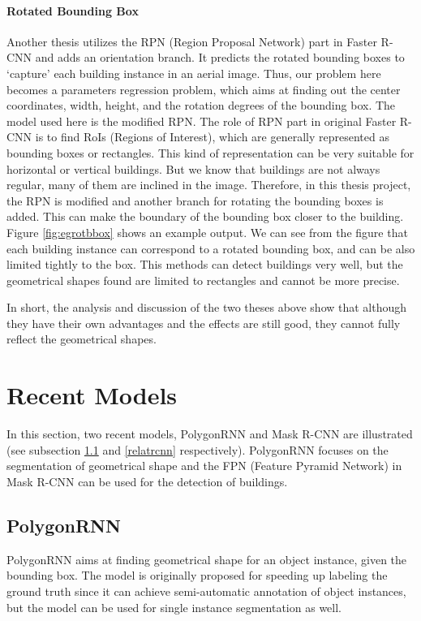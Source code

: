 \paragraph{Rotated Bounding Box}
Another thesis utilizes the RPN (Region Proposal Network) part in Faster R-CNN and adds an orientation branch. It predicts the rotated bounding boxes to `capture' each building instance in an aerial image. Thus, our problem here becomes a parameters regression problem, which aims at finding out the center coordinates, width, height, and the rotation degrees of the bounding box. The model used here is the modified RPN. The role of RPN part in original Faster R-CNN is to find RoIs (Regions of Interest), which are generally represented as bounding boxes or rectangles. This kind of representation can be very suitable for horizontal or vertical buildings. But we know that buildings are not always regular, many of them are inclined in the image. Therefore, in this thesis project, the RPN is modified and another branch for rotating the bounding boxes is added. This can make the boundary of the bounding box closer to the building. Figure \ref{fig:egrotbbox} shows an example output. We can see from the figure that each building instance can correspond to a rotated bounding box, and can be also limited tightly to the box. This methods can detect buildings very well, but the geometrical shapes found are limited to rectangles and cannot be more precise.



In short, the analysis and discussion of the two theses above show that although they have their own advantages and the effects are still good, they cannot fully reflect the geometrical shapes.

\section{Recent Models}\label{relatrec}

In this section, two recent models, PolygonRNN and Mask R-CNN are illustrated (see subsection \ref{relatpoly} and \ref{relatrcnn} respectively). PolygonRNN focuses on the segmentation of geometrical shape and the FPN (Feature Pyramid Network) in Mask R-CNN can be used for the detection of buildings.

\subsection{PolygonRNN}\label{relatpoly}
PolygonRNN aims at finding geometrical shape for an object instance, given the bounding box. The model is originally proposed for speeding up labeling the ground truth since it can achieve semi-automatic annotation of object instances, but the model can be used for single instance segmentation as well.

